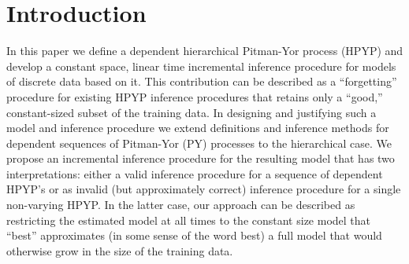 \section{Introduction}
In this paper we define a dependent hierarchical Pitman-Yor process (HPYP) \cite{Teh2006a} and develop a constant space, linear time incremental inference procedure for models of discrete data based on it.   This contribution can be described as a ``forgetting'' procedure for existing HPYP inference procedures that retains only a ``good,'' constant-sized subset of the training data.  In designing and justifying such a model and inference procedure we extend definitions and inference methods for dependent sequences of Pitman-Yor (PY) processes \cite{Caron2007, Caron2007a} to the hierarchical case.    We propose an incremental inference procedure for the resulting model that has two interpretations: either a valid inference procedure for a sequence of dependent HPYP's or as invalid (but approximately correct) inference procedure for a single non-varying HPYP.   In the latter case, our approach can be described as restricting the estimated model at all times  to the constant size model that ``best'' approximates (in some sense of the word best) a full model that would otherwise grow in the size of the training data.   

